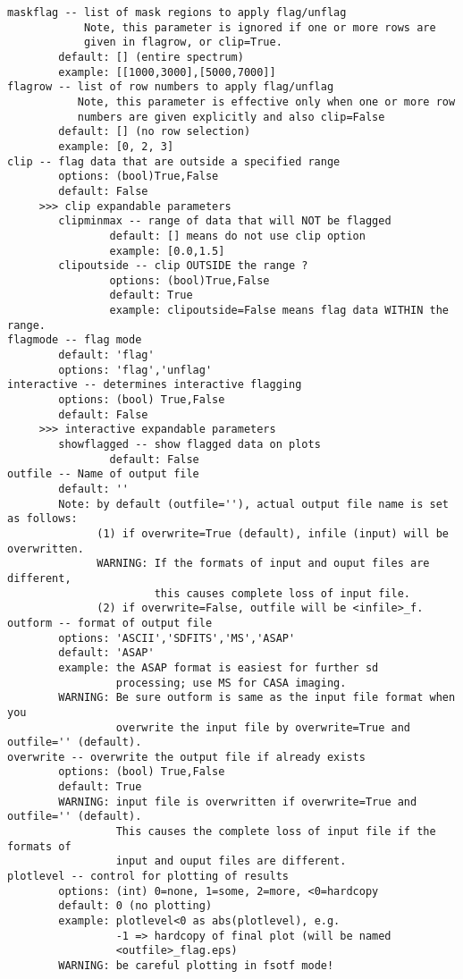 \begin{verbatim}
maskflag -- list of mask regions to apply flag/unflag 
            Note, this parameter is ignored if one or more rows are 
            given in flagrow, or clip=True.
        default: [] (entire spectrum)
        example: [[1000,3000],[5000,7000]]
flagrow -- list of row numbers to apply flag/unflag
           Note, this parameter is effective only when one or more row 
           numbers are given explicitly and also clip=False
        default: [] (no row selection)
        example: [0, 2, 3]
clip -- flag data that are outside a specified range
        options: (bool)True,False
        default: False
     >>> clip expandable parameters
        clipminmax -- range of data that will NOT be flagged
                default: [] means do not use clip option
                example: [0.0,1.5]
        clipoutside -- clip OUTSIDE the range ?
                options: (bool)True,False
                default: True
                example: clipoutside=False means flag data WITHIN the range.
flagmode -- flag mode
        default: 'flag'
        options: 'flag','unflag'
interactive -- determines interactive flagging
        options: (bool) True,False
        default: False
     >>> interactive expandable parameters
        showflagged -- show flagged data on plots
                default: False
outfile -- Name of output file
        default: ''
        Note: by default (outfile=''), actual output file name is set as follows: 
              (1) if overwrite=True (default), infile (input) will be overwritten.
              WARNING: If the formats of input and ouput files are different, 
                       this causes complete loss of input file.
              (2) if overwrite=False, outfile will be <infile>_f. 
outform -- format of output file
        options: 'ASCII','SDFITS','MS','ASAP'
        default: 'ASAP'
        example: the ASAP format is easiest for further sd
                 processing; use MS for CASA imaging.
        WARNING: Be sure outform is same as the input file format when you 
                 overwrite the input file by overwrite=True and outfile='' (default).
overwrite -- overwrite the output file if already exists
        options: (bool) True,False
        default: True
        WARNING: input file is overwritten if overwrite=True and outfile='' (default). 
                 This causes the complete loss of input file if the formats of
                 input and ouput files are different.
plotlevel -- control for plotting of results
        options: (int) 0=none, 1=some, 2=more, <0=hardcopy
        default: 0 (no plotting)
        example: plotlevel<0 as abs(plotlevel), e.g.
                 -1 => hardcopy of final plot (will be named
                 <outfile>_flag.eps)
        WARNING: be careful plotting in fsotf mode!

\end{verbatim}


